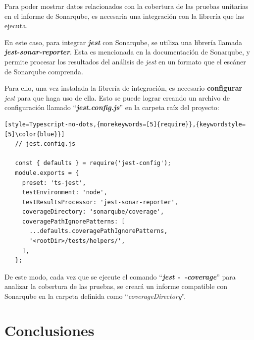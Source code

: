 \documentclass[11pt,spanish,listoffigures,listoftables,table,hyphens,dvipsnames]{tfgetsinf}
\begin{document}
Para poder mostrar datos relacionados con la cobertura de las pruebas unitarias en el informe de Sonarqube, es necesaria una integración con la librería que las ejecuta.

En este caso, para integrar \textbf{\emph{jest}} con Sonarqube, se utiliza una librería llamada \textbf{\emph{jest-sonar-reporter}}. Esta es mencionada en la documentación de Sonarqube, y permite procesar los resultados del análisis de \emph{jest} en un formato que el escáner de Sonarqube comprenda.

Para ello, una vez instalada la librería de integración, es necesario \textbf{configurar} \emph{jest} para que haga uso de ella. Esto se puede lograr creando un archivo de configuración llamado ``\textbf{\emph{jest.config.js}}'' en la carpeta raíz del proyecto:

\begin{lstlisting}[style=Typescript-no-dots,{morekeywords=[5]{require}},{keywordstyle=[5]\color{blue}}]
   // jest.config.js

   const { defaults } = require('jest-config');
   module.exports = {
     preset: 'ts-jest',
     testEnvironment: 'node',
     testResultsProcessor: 'jest-sonar-reporter',
     coverageDirectory: 'sonarqube/coverage',
     coveragePathIgnorePatterns: [
       ...defaults.coveragePathIgnorePatterns,
       '<rootDir>/tests/helpers/',
     ],
   };

\end{lstlisting}

De este modo, cada vez que se ejecute el comando ``\textbf{\emph{jest -~-coverage}}'' para analizar la cobertura de las pruebas, se creará un informe compatible con Sonarqube en la carpeta definida como ``\emph{coverageDirectory}''.

%


\chapter{Conclusiones}
\label{capitulo:conclusiones}
\end{document}
